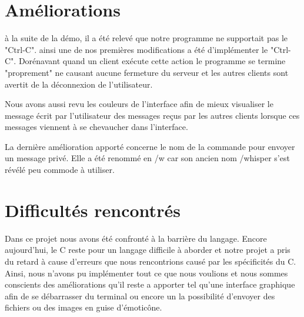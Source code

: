 \section{Améliorations}
à la suite de la démo, il a été relevé que notre programme ne supportait pas le "Ctrl-C". ainsi une de nos premières modifications a été d'implémenter le "Ctrl-C". Dorénavant quand un client exécute cette action le programme se termine "proprement" ne causant aucune fermeture du serveur et les autres clients sont avertit de la déconnexion de l'utilisateur.

Nous avons aussi revu les couleurs de l'interface afin de mieux visualiser le message écrit par l'utilisateur des messages reçus par les autres clients lorsque ces messages viennent à se chevaucher dans l'interface.

La dernière amélioration apporté concerne le nom de la commande pour envoyer un message privé. Elle a été renommé en /w car son ancien nom /whisper s'est révélé peu commode à utiliser.

\section{Difficultés rencontrés}
Dans ce projet nous avons été confronté à la barrière du langage. Encore aujourd'hui, le C reste pour un langage difficile à aborder et notre projet a pris du retard à cause d'erreurs que nous rencontrions causé par les spécificités du C. Ainsi, nous n'avons pu implémenter tout ce que nous voulions et nous sommes conscients des améliorations qu'il reste a
apporter tel qu'une interface graphique afin de se débarrasser du terminal ou encore un la possibilité d'envoyer des fichiers ou des images en guise d'émoticône.  




